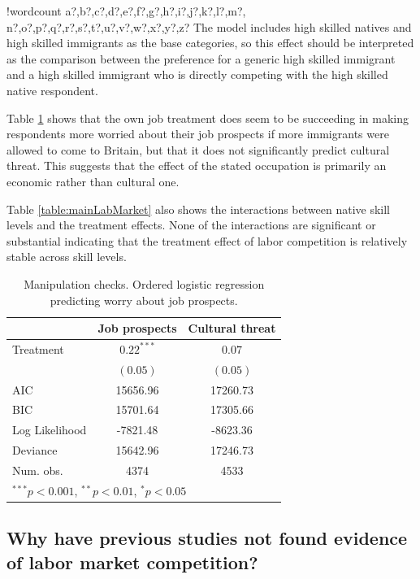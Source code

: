 \documentclass{article}\usepackage[]{graphicx}\usepackage[]{color}
\newcounter{words}
\newenvironment{counted}{%
\setcounter{words}{0}
\SearchList!{wordcount}{\stepcounter{words}}
{a?,b?,c?,d?,e?,f?,g?,h?,i?,j?,k?,l?,m?,
n?,o?,p?,q?,r?,s?,t?,u?,v?,w?,x?,y?,z?}
\UndoBoundary{'}
\SearchOrder{p;}}{%
\StopSearching}
\begin{document}
\begin{counted}
The model includes high skilled natives and high skilled immigrants as the base categories, so this effect should be interpreted as the comparison between the preference for a generic high skilled immigrant and a high skilled immigrant who is directly competing with the high skilled native respondent. 

Table \ref{table:manipulation_checks} shows that the own job treatment does seem to be succeeding in making respondents more worried about their job prospects if more immigrants were allowed to come to Britain, but that it does not significantly predict cultural threat. This suggests that the effect of the stated occupation is primarily an economic rather than cultural one. 

Table \ref{table:mainLabMarket} also shows the interactions between native skill levels and the treatment effects. None of the interactions are significant or substantial indicating that the treatment effect of labor competition is relatively stable across skill levels.


\begin{table}
\begin{center}
\begin{tabular}{l c c }
\hline
 & Job prospects & Cultural threat \\
\hline
Treatment      & $0.22^{***}$ & $0.07$   \\
               & $(0.05)$     & $(0.05)$ \\
\hline
AIC            & 15656.96     & 17260.73 \\
BIC            & 15701.64     & 17305.66 \\
Log Likelihood & -7821.48     & -8623.36 \\
Deviance       & 15642.96     & 17246.73 \\
Num. obs.      & 4374         & 4533     \\
\hline
\multicolumn{3}{l}{\scriptsize{$^{***}p<0.001$, $^{**}p<0.01$, $^*p<0.05$}}
\end{tabular}
\caption{Manipulation checks. Ordered logistic regression predicting worry about job prospects.}
\label{table:manipulation_checks}
\end{center}
\end{table}


\subsection{Why have previous studies not found evidence of labor market competition?}


\end{counted}
\end{document}
